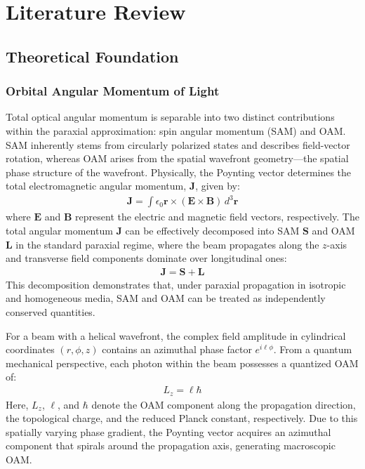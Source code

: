 \chapter{Literature Review}

\label{ch:Literature Review}

\section{Theoretical Foundation}

\subsection{Orbital Angular Momentum of Light}
\label{ssec:oam of light}

Total optical angular momentum is separable into two distinct contributions within the paraxial approximation: spin angular momentum (SAM) and OAM. SAM inherently stems from circularly polarized states and describes field-vector rotation, whereas OAM arises from the spatial wavefront geometry—the spatial phase structure of the wavefront. Physically, the Poynting vector determines the total electromagnetic angular momentum, $\mathbf{J}$, given by:
\begin{align} 
\mathbf{J} =\int \epsilon_0 \mathbf{r} \times (\mathbf{E} \times \mathbf{B}) \, d^{3}\mathbf{r}
\end{align} 
where $\mathbf{E}$ and $\mathbf{B}$ represent the electric and magnetic field vectors, respectively. The total angular momentum $\mathbf{J}$ can be effectively decomposed into  SAM $\mathbf{S}$ and OAM $\mathbf{L}$ in the standard paraxial regime, where the beam propagates along the $z$-axis and transverse field components dominate over longitudinal ones:
\begin{align}
\mathbf{J} = \mathbf{S} + \mathbf{L}
\end{align}
This decomposition demonstrates that, under paraxial propagation in isotropic and homogeneous media, SAM and OAM can be treated as independently conserved quantities.

For a beam with a helical wavefront, the complex field amplitude in cylindrical coordinates $(r, \phi, z)$ contains an azimuthal phase factor $e^{i\ell\phi}$. From a quantum mechanical perspective, each photon within the beam possesses a quantized OAM of:
\begin{align}
L_z = \ell\hbar
\end{align}
Here, $L_z$, $\ell$, and $\hbar$ denote the OAM component along the propagation direction, the topological charge, and the reduced Planck constant, respectively. Due to this spatially varying phase gradient, the Poynting vector acquires an azimuthal component that spirals around the propagation axis, generating macroscopic OAM.


